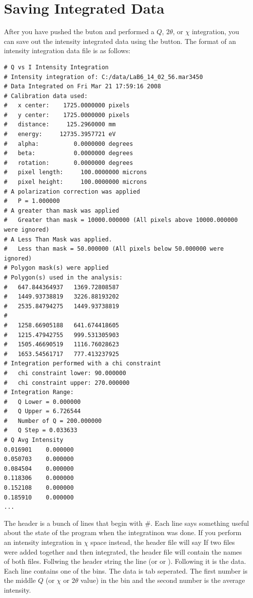 \section{Saving Integrated Data}

After you have pushed the  buton
and performed a $Q$, $2\theta$, or $\chi$ integration,
you can save out the intensity integrated data
using the  button. The format of 
an intensity integration data file is as follows:
\begin{lstlisting}[caption={'A Cake Data File'}]
# Q vs I Intensity Integration
# Intensity integration of: C:/data/LaB6_14_02_56.mar3450 
# Data Integrated on Fri Mar 21 17:59:16 2008
# Calibration data used:
#   x center:    1725.0000000 pixels
#   y center:    1725.0000000 pixels
#   distance:     125.2960000 mm
#   energy:     12735.3957721 eV
#   alpha:          0.0000000 degrees
#   beta:           0.0000000 degrees
#   rotation:       0.0000000 degrees
#   pixel length:     100.0000000 microns
#   pixel height:     100.0000000 microns
# A polarization correction was applied
#   P = 1.000000
# A greater than mask was applied
#   Greater than mask = 10000.000000 (All pixels above 10000.000000 were ignored)
# A Less Than Mask was applied.
#   Less than mask = 50.000000 (All pixels below 50.000000 were ignored)
# Polygon mask(s) were applied
# Polygon(s) used in the analysis:
#   647.844364937	1369.72808587
#   1449.93738819	3226.88193202
#   2535.84794275	1449.93738819
#
#   1258.66905188	641.674418605
#   1215.47942755	999.531305903
#   1505.46690519	1116.76028623
#   1653.54561717	777.413237925
# Integration performed with a chi constraint
#   chi constraint lower: 90.000000
#   chi constraint upper: 270.000000
# Integration Range:
#   Q Lower = 0.000000
#   Q Upper = 6.726544
#   Number of Q = 200.000000
#   Q Step = 0.033633
# Q	Avg Intensity
0.016901	0.000000
0.050703	0.000000
0.084504	0.000000
0.118306	0.000000
0.152108	0.000000
0.185910	0.000000
...
\end{lstlisting}
The header is a bunch of lines that begin with \#.
Each line says something useful about the state
of the program when the integratinon was
done. 
If you perform an intensity integration in $\chi$
space instead, the header file will say
If two files were added together and then integrated, the 
header file will contain the names of both files.
Follwing the header string the line
 (or 
or ). Following it is
the data. Each line contains one of the bins. The data
is tab seperated. The first number is the middle $Q$ (or
$\chi$ or $2\theta$ value) in the bin and the second number
is the average intensity.



